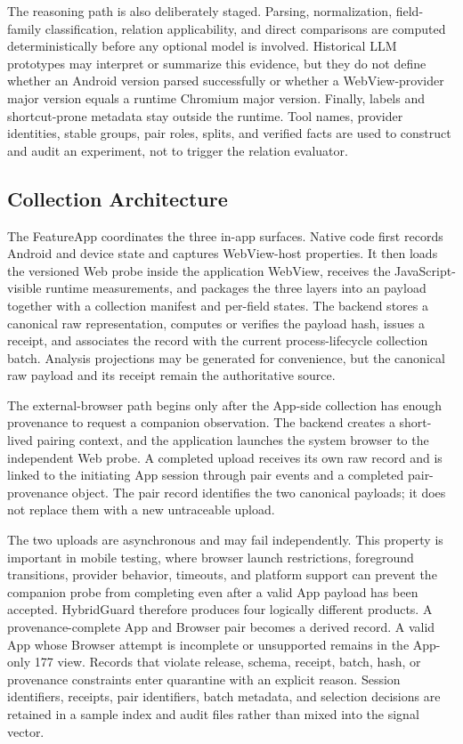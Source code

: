 The reasoning path is also deliberately staged. Parsing, normalization, field-family classification, relation applicability, and direct comparisons are computed deterministically before any optional model is involved. Historical LLM prototypes may interpret or summarize this evidence, but they do not define whether an Android version parsed successfully or whether a WebView-provider major version equals a runtime Chromium major version. Finally, labels and shortcut-prone metadata stay outside the runtime. Tool names, provider identities, stable groups, pair roles, splits, and verified facts are used to construct and audit an experiment, not to trigger the relation evaluator.

\subsection{Collection Architecture}

The FeatureApp coordinates the three in-app surfaces. Native code first records Android and device state and captures WebView-host properties. It then loads the versioned Web probe inside the application WebView, receives the JavaScript-visible runtime measurements, and packages the three layers into an \appfp payload together with a collection manifest and per-field states. The backend stores a canonical raw representation, computes or verifies the payload hash, issues a receipt, and associates the record with the current process-lifecycle collection batch. Analysis projections may be generated for convenience, but the canonical raw payload and its receipt remain the authoritative source.

The external-browser path begins only after the App-side collection has enough provenance to request a companion observation. The backend creates a short-lived pairing context, and the application launches the system browser to the independent Web probe. A completed \browserfp upload receives its own raw record and is linked to the initiating App session through pair events and a completed pair-provenance object. The pair record identifies the two canonical payloads; it does not replace them with a new untraceable upload.

The two uploads are asynchronous and may fail independently. This property is important in mobile testing, where browser launch restrictions, foreground transitions, provider behavior, timeouts, and platform support can prevent the companion probe from completing even after a valid App payload has been accepted. HybridGuard therefore produces four logically different products. A provenance-complete App and Browser pair becomes a derived \pairedfp record. A valid App whose Browser attempt is incomplete or unsupported remains in the App-only 177 view. Records that violate release, schema, receipt, batch, hash, or provenance constraints enter quarantine with an explicit reason. Session identifiers, receipts, pair identifiers, batch metadata, and selection decisions are retained in a sample index and audit files rather than mixed into the signal vector.


